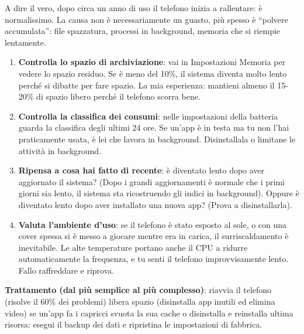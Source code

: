 


A dire il vero, dopo circa un anno di uso il telefono inizia a rallentare: è normalissimo. La causa non è necessariamente un guasto, più spesso è “polvere accumulata”: file spazzatura, processi in background, memoria che si riempie lentamente.


\begin{enumerate}
  \item \textbf{Controlla lo spazio di archiviazione}: vai in Impostazioni Memoria per vedere lo spazio residuo. Se è meno del 10\%, il sistema diventa molto lento perché si dibatte per fare spazio. La mia esperienza: mantieni almeno il 15-20\% di spazio libero perché il telefono scorra bene.
  \item \textbf{Controlla la classifica dei consumi}: nelle impostazioni della batteria guarda la classifica degli ultimi 24 ore. Se un'app è in testa ma tu non l'hai praticamente usata, è lei che lavora in background. Disinstallala o limitane le attività in background.
  \item \textbf{Ripensa a cosa hai fatto di recente}: è diventato lento dopo aver aggiornato il sistema? (Dopo i grandi aggiornamenti è normale che i primi giorni sia lento, il sistema sta ricostruendo gli indici in background). Oppure è diventato lento dopo aver installato una nuova app? (Prova a disinstallarla).
  \item \textbf{Valuta l'ambiente d'uso}: se il telefono è stato esposto al sole, o con una cover spessa si è messo a giocare mentre era in carica, il surriscaldamento è inevitabile. Le alte temperature portano anche il CPU a ridurre automaticamente la frequenza, e tu senti il telefono improvvisamente lento. Fallo raffreddare e riprova.
\end{enumerate}

\textbf{Trattamento (dal più semplice al più complesso)}: riavvia il telefono (risolve il 60\% dei problemi) libera spazio (disinstalla app inutili ed elimina video) se un'app fa i capricci svuota la sua cache o disinstalla e reinstalla ultima risorsa: esegui il backup dei dati e ripristina le impostazioni di fabbrica.

